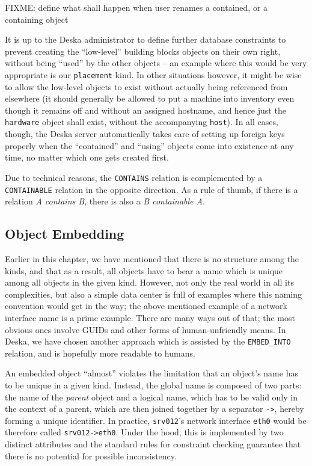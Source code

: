 \documentclass[deska]{subfiles}
\begin{document}
FIXME: define what shall happen when user renames a contained, or a containing object

It is up to the Deska administrator to define further database constraints to prevent creating the ``low-level''
building blocks objects on their own right, without being ``used'' by the other objects -- an example where this would
be very appropriate is our {\tt placement} kind.  In other situations however, it might be wise to allow the low-level
objects to exist without actually being referenced from elsewhere (it should generally be allowed to put a machine into
inventory even though it remains off and without an assigned hostname, and hence just the {\tt hardware} object shall
exist, without the accompanying {\tt host}).  In all cases, though, the Deska server automatically takes care of setting
up foreign keys properly when the ``contained'' and ``using'' objects come into existence at any time, no matter which
one gets created first.

Due to technical reasons, the {\tt CONTAINS} relation is complemented by a {\tt CONTAINABLE} relation in the opposite
direction.  As a rule of thumb, if there is a relation {\em A contains B}, there is also a {\em B containable A}.

\subsection{Object Embedding}

Earlier in this chapter, we have mentioned that there is no structure among the kinds, and that as a result, all objects
have to bear a name which is unique among all objects in the given kind.  However, not only the real world in all its
complexities, but also a simple data center is full of examples where this naming convention would get in the way; the
above mentioned example of a network interface name is a prime example.  There are many ways out of that; the most
obvious ones involve GUIDs and other forms of human-unfriendly means.  In Deska, we have chosen another approach which
is assisted by the {\tt EMBED\_INTO} relation, and is hopefully more readable to humans.

An embedded object ``almost'' violates the limitation that an object's name has to be unique in a given kind.  Instead,
the global name is composed of two parts: the name of the {\em parent} object and a logical name, which has to be valid
only in the context of a parent, which are then joined together by a separator {\tt ->}, hereby forming a unique
identifier.  In practice, {\tt srv012}'s network interface {\tt eth0} would be therefore called {\tt srv012->eth0}.
Under the hood, this is implemented by two distinct attributes and the standard rules for constraint checking guarantee
that there is no potential for possible inconsistency.
\end{document}
